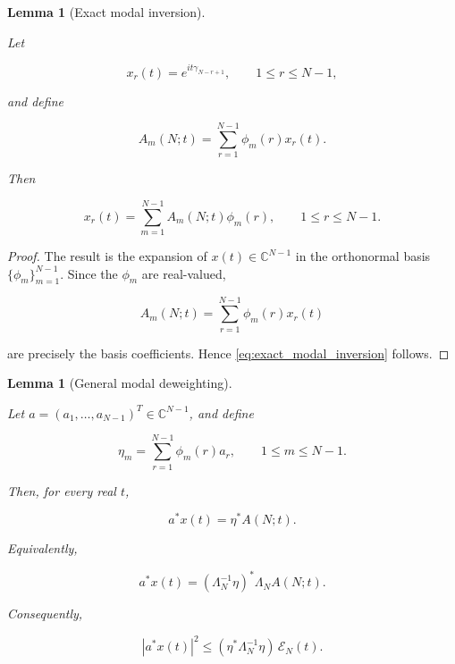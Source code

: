 \documentclass[11pt]{amsart}
\numberwithin{equation}{section}
\theoremstyle{plain}
\newtheorem{lemma}[theorem]{Lemma}
\theoremstyle{definition}
\theoremstyle{remark}
\begin{document}
\begin{lemma}[Exact modal inversion]
\label{lem:exact_modal_inversion}

Let

\begin{equation}
x_r(t)=e^{it\gamma_{N-r+1}},
\qquad
1\le r\le N-1,
\end{equation}

and define

\begin{equation}
A_m(N;t)
=
\sum_{r=1}^{N-1}
\phi_m(r)x_r(t).
\end{equation}

Then

\begin{equation}
x_r(t)
=
\sum_{m=1}^{N-1}
A_m(N;t)\phi_m(r),
\qquad
1\le r\le N-1.
\label{eq:exact_modal_inversion}
\end{equation}

\end{lemma}

\begin{proof}
The result is the expansion of \(x(t)\in\mathbb C^{N-1}\) in the
orthonormal basis \(\{\phi_m\}_{m=1}^{N-1}\). Since the \(\phi_m\) are
real-valued,

\begin{equation}
A_m(N;t)
=
\sum_{r=1}^{N-1}\phi_m(r)x_r(t)
\end{equation}

are precisely the basis coefficients. Hence
\eqref{eq:exact_modal_inversion} follows.
\end{proof}

\begin{lemma}[General modal deweighting]
\label{lem:general_modal_deweighting}

Let \(a=(a_1,\ldots,a_{N-1})^T\in\mathbb C^{N-1}\), and define

\begin{equation}
\eta_m
=
\sum_{r=1}^{N-1}\phi_m(r)a_r,
\qquad
1\le m\le N-1.
\label{eq:general_deweighting_eta_definition}
\end{equation}

Then, for every real \(t\),

\begin{equation}
a^*x(t)
=
\eta^*A(N;t).
\label{eq:general_deweighting_exact_recovery}
\end{equation}

Equivalently,

\begin{equation}
a^*x(t)
=
(\Lambda_N^{-1}\eta)^*\Lambda_NA(N;t).
\label{eq:general_deweighting_green_metric_recovery}
\end{equation}

Consequently,

\begin{equation}
|a^*x(t)|^2
\le
(\eta^*\Lambda_N^{-1}\eta)\,\mathcal E_N(t).
\label{eq:general_deweighting_green_bound}
\end{equation}

\end{lemma}
\end{document}
